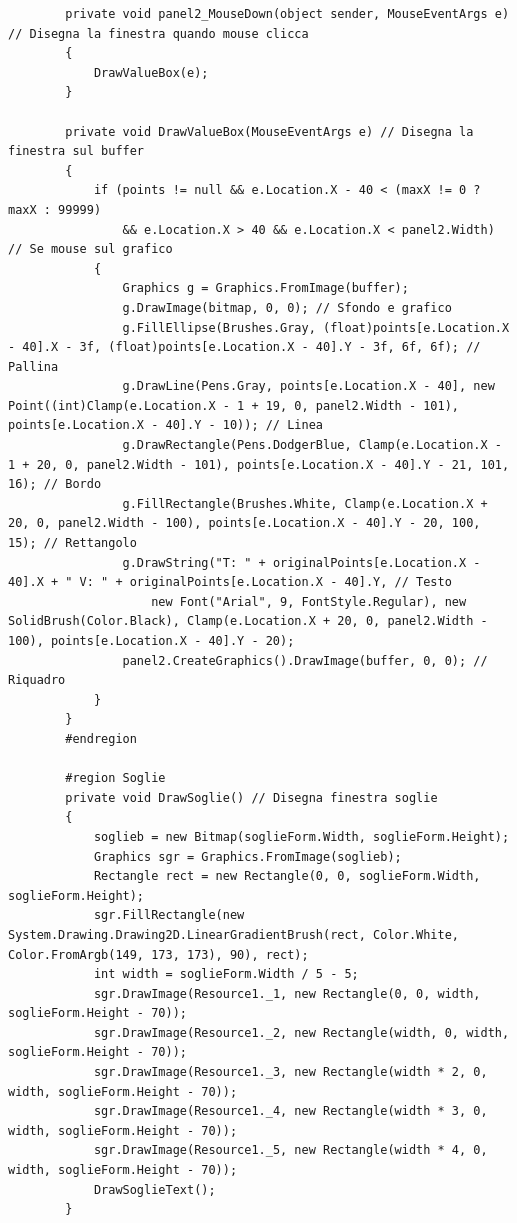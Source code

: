 \documentclass[11pt]{article} %
\begin{document}
\begin{lstlisting}
        private void panel2_MouseDown(object sender, MouseEventArgs e) // Disegna la finestra quando mouse clicca
        {
            DrawValueBox(e);
        }

        private void DrawValueBox(MouseEventArgs e) // Disegna la finestra sul buffer
        {
            if (points != null && e.Location.X - 40 < (maxX != 0 ? maxX : 99999)
                && e.Location.X > 40 && e.Location.X < panel2.Width) // Se mouse sul grafico
            {
                Graphics g = Graphics.FromImage(buffer);
                g.DrawImage(bitmap, 0, 0); // Sfondo e grafico
                g.FillEllipse(Brushes.Gray, (float)points[e.Location.X - 40].X - 3f, (float)points[e.Location.X - 40].Y - 3f, 6f, 6f); // Pallina
                g.DrawLine(Pens.Gray, points[e.Location.X - 40], new Point((int)Clamp(e.Location.X - 1 + 19, 0, panel2.Width - 101), points[e.Location.X - 40].Y - 10)); // Linea
                g.DrawRectangle(Pens.DodgerBlue, Clamp(e.Location.X - 1 + 20, 0, panel2.Width - 101), points[e.Location.X - 40].Y - 21, 101, 16); // Bordo
                g.FillRectangle(Brushes.White, Clamp(e.Location.X + 20, 0, panel2.Width - 100), points[e.Location.X - 40].Y - 20, 100, 15); // Rettangolo
                g.DrawString("T: " + originalPoints[e.Location.X - 40].X + " V: " + originalPoints[e.Location.X - 40].Y, // Testo
                    new Font("Arial", 9, FontStyle.Regular), new SolidBrush(Color.Black), Clamp(e.Location.X + 20, 0, panel2.Width - 100), points[e.Location.X - 40].Y - 20);
                panel2.CreateGraphics().DrawImage(buffer, 0, 0); // Riquadro
            }
        } 
        #endregion

        #region Soglie
        private void DrawSoglie() // Disegna finestra soglie
        {
            soglieb = new Bitmap(soglieForm.Width, soglieForm.Height);
            Graphics sgr = Graphics.FromImage(soglieb);
            Rectangle rect = new Rectangle(0, 0, soglieForm.Width, soglieForm.Height);
            sgr.FillRectangle(new System.Drawing.Drawing2D.LinearGradientBrush(rect, Color.White, Color.FromArgb(149, 173, 173), 90), rect);
            int width = soglieForm.Width / 5 - 5;
            sgr.DrawImage(Resource1._1, new Rectangle(0, 0, width, soglieForm.Height - 70));
            sgr.DrawImage(Resource1._2, new Rectangle(width, 0, width, soglieForm.Height - 70));
            sgr.DrawImage(Resource1._3, new Rectangle(width * 2, 0, width, soglieForm.Height - 70));
            sgr.DrawImage(Resource1._4, new Rectangle(width * 3, 0, width, soglieForm.Height - 70));
            sgr.DrawImage(Resource1._5, new Rectangle(width * 4, 0, width, soglieForm.Height - 70));
            DrawSoglieText();
        }


\end{lstlisting}
\end{document}
